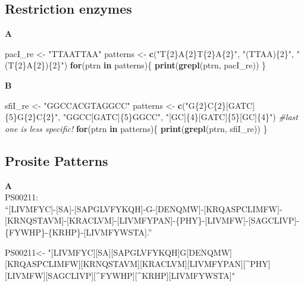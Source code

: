 \documentclass[]{book}
\newenvironment{Shaded}{\begin{snugshade}}{\end{snugshade}}
\newcommand{\CommentTok}[1]{\textcolor[rgb]{0.56,0.35,0.01}{\textit{#1}}}
\newcommand{\ControlFlowTok}[1]{\textcolor[rgb]{0.13,0.29,0.53}{\textbf{#1}}}
\newcommand{\KeywordTok}[1]{\textcolor[rgb]{0.13,0.29,0.53}{\textbf{#1}}}
\newcommand{\NormalTok}[1]{#1}
\newcommand{\StringTok}[1]{\textcolor[rgb]{0.31,0.60,0.02}{#1}}
\begin{document}
\hypertarget{restriction-enzymes-2}{%
\subsection{Restriction enzymes}\label{restriction-enzymes-2}}

\textbf{A}

\begin{Shaded}
\begin{Highlighting}[]
\NormalTok{pacI_re <-}\StringTok{ "TTAATTAA"}
\NormalTok{patterns <-}\StringTok{ }\KeywordTok{c}\NormalTok{(}\StringTok{"T\{2\}A\{2\}T\{2\}A\{2\}"}\NormalTok{,}
           \StringTok{"(TTAA)\{2\}"}\NormalTok{, }
           \StringTok{"(T\{2\}A\{2\})\{2\}"}\NormalTok{)}
\ControlFlowTok{for}\NormalTok{(ptrn }\ControlFlowTok{in}\NormalTok{ patterns)\{}
    \KeywordTok{print}\NormalTok{(}\KeywordTok{grepl}\NormalTok{(ptrn, pacI_re))}
\NormalTok{\}}
\end{Highlighting}
\end{Shaded}

\textbf{B}

\begin{Shaded}
\begin{Highlighting}[]
\NormalTok{sfiI_re <-}\StringTok{ "GGCCACGTAGGCC"}
\NormalTok{patterns <-}\StringTok{ }\KeywordTok{c}\NormalTok{(}\StringTok{"G\{2\}C\{2\}[GATC]\{5\}G\{2\}C\{2\}"}\NormalTok{,}
           \StringTok{"GGCC[GATC]\{5\}GGCC"}\NormalTok{, }
           \StringTok{"[GC]\{4\}[GATC]\{5\}[GC]\{4\}"}\NormalTok{) }\CommentTok{#last one is less specific!}
\ControlFlowTok{for}\NormalTok{(ptrn }\ControlFlowTok{in}\NormalTok{ patterns)\{}
    \KeywordTok{print}\NormalTok{(}\KeywordTok{grepl}\NormalTok{(ptrn, sfiI_re))}
\NormalTok{\}}
\end{Highlighting}
\end{Shaded}

\hypertarget{prosite-patterns-2}{%
\subsection{Prosite Patterns}\label{prosite-patterns-2}}

\textbf{A}\\
PS00211:\\
``{[}LIVMFYC{]}-{[}SA{]}-{[}SAPGLVFYKQH{]}-G-{[}DENQMW{]}-{[}KRQASPCLIMFW{]}-{[}KRNQSTAVM{]}-{[}KRACLVM{]}-{[}LIVMFYPAN{]}-\{PHY\}-{[}LIVMFW{]}-{[}SAGCLIVP{]}-\{FYWHP\}-\{KRHP\}-{[}LIVMFYWSTA{]}.''

\begin{Shaded}
\begin{Highlighting}[]
\NormalTok{PS00211<-}\StringTok{ "[LIVMFYC][SA][SAPGLVFYKQH]G[DENQMW][KRQASPCLIMFW][KRNQSTAVM][KRACLVM][LIVMFYPAN][^PHY][LIVMFW][SAGCLIVP][^FYWHP][^KRHP][LIVMFYWSTA]"}
\end{Highlighting}
\end{Shaded}
\end{document}
